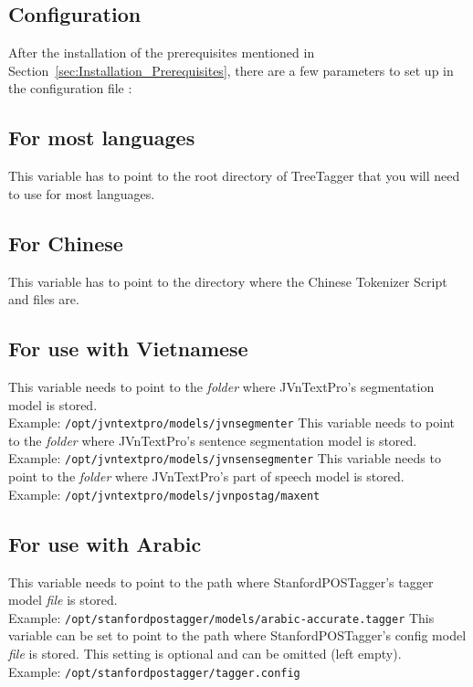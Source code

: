 \subsection{Configuration}\label{sec:Installation_Configuration}
After the installation of the prerequisites mentioned in Section~\ref{sec:Installation_Prerequisites}, there are a few parameters to set up in the configuration file \configFile{}:
\begin{itemize}

\subsection*{\textbf{For most languages}}
This variable has to point to the root directory of TreeTagger that you will need to use for most languages.

\subsection*{\textbf{For Chinese}}
This variable has to point to the directory where the Chinese Tokenizer Script and files are.

\subsection*{\textbf{For use with Vietnamese}}
This variable needs to point to the \textit{folder} where JVnTextPro's segmentation model is stored. \\
Example: \texttt{/opt/jvntextpro/models/jvnsegmenter}
This variable needs to point to the \textit{folder} where JVnTextPro's sentence segmentation model is stored. \\
Example: \texttt{/opt/jvntextpro/models/jvnsensegmenter}
This variable needs to point to the \textit{folder} where JVnTextPro's part of speech model is stored. \\
Example: \texttt{/opt/jvntextpro/models/jvnpostag/maxent}

\subsection*{\textbf{For use with Arabic}}
This variable needs to point to the path where StanfordPOSTagger's tagger model \textit{file} is stored. \\
Example: \texttt{/opt/stanfordpostagger/models/arabic-accurate.tagger}
This variable can be set to point to the path where StanfordPOSTagger's config model \textit{file} is stored. This setting is optional and can be omitted (left empty). \\
Example: \texttt{/opt/stanfordpostagger/tagger.config}


\end{itemize}
